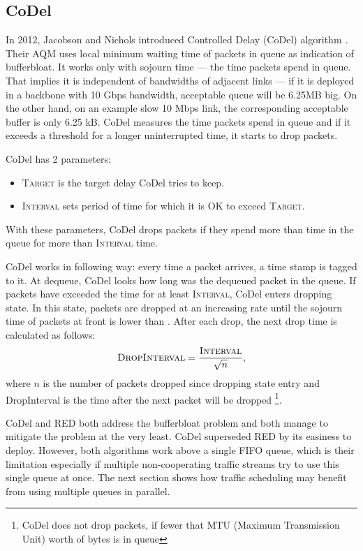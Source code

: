 \subsection{CoDel}
\label{CoDel}
In 2012, Jacobson and Nichols introduced Controlled Delay (CoDel) algorithm \cite{CoDel}. Their AQM uses local minimum waiting time of packets in queue as indication of bufferbloat. It works only with sojourn time --- the time packets spend in queue. That implies it is independent of bandwidths of adjacent links --- if it is deployed in a backbone with 10 Gbps bandwidth, acceptable queue will be 6.25MB big. On the other hand, on an example slow 10 Mbps link, the corresponding acceptable buffer is only 6.25 kB. CoDel measures the time packets spend in queue and if it exceeds a threshold for a longer uninterrupted time, it starts to drop packets.

CoDel has 2 parameters:
\begin{itemize}
	\item \textsc{Target} is the target delay CoDel tries to keep.
	\item \textsc{Interval} sets period of time for which it is OK to exceed \textsc{Target}.
\end{itemize}
With these parameters, CoDel drops packets if they spend more than  time in the queue for more than \textsc{Interval} time.

CoDel works in following way: every time a packet arrives, a time stamp is tagged to it. At dequeue, CoDel looks how long was the dequeued packet in the queue. If packets have exceeded the  time for at least \textsc{Interval}, CoDel enters dropping state. In this state, packets are dropped at an increasing rate until the sojourn time of packets at front is lower than . After each drop, the next drop time is calculated as follows:
\[
  \textsc{DropInterval} = \frac{\textsc{Interval}}{\sqrt{n}},
\]
where $n$ is the number of packets dropped since dropping state entry and DropInterval is the time after the next packet will be dropped \footnote{CoDel does not drop packets, if fewer that MTU (Maximum Transmission Unit) worth of bytes is in queue}.


 
CoDel and RED both address the bufferbloat problem and both manage to mitigate the problem at the very least. CoDel superseded RED by its easiness to deploy. However, both algorithms work above a single FIFO queue, which is their limitation especially if multiple non-cooperating traffic streams try to use this single queue at once. The next section shows how traffic scheduling may benefit from using multiple queues in parallel.

